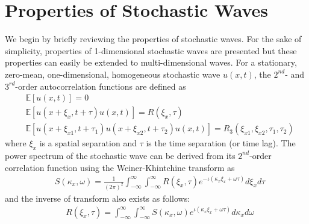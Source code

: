 \documentclass[preprint, review, 12pt]{elsarticle}
\begin{document}

\section{Properties of Stochastic Waves}

We begin by briefly reviewing the properties of stochastic waves. For the sake of simplicity, properties of 1-dimensional stochastic waves are presented but these properties can easily be extended to multi-dimensional waves. For a stationary, zero-mean, one-dimensional, homogeneous stochastic wave $u(x, t)$, the $2^{nd}$- and $3^{rd}$-order autocorrelation functions are defined as
\begin{equation}
\begin{aligned}
	& \mathbb{E}[u(x, t)] = 0\\
	& \mathbb{E}[u(x + \xi_{x}, t + \tau)u(x, t)] = R(\xi_{x}, \tau)\\
	& \mathbb{E}[u(x + \xi_{x1}, t + \tau_{1})u(x + \xi_{x2}, t + \tau_{2})u(x, t)] = R_{3}(\xi_{x1}, \xi_{x2}, \tau_{1}, \tau_{2})
\end{aligned}
\end{equation}
where $\xi_{x}$ is a spatial separation and $\tau$ is the time separation (or time lag). The power spectrum of the stochastic wave can be derived from its $2^{nd}$-order correlation function using the Weiner-Khintchine transform as
\begin{equation}
\begin{aligned}
	& S(\kappa_{x}, \omega) = \frac{1}{(2\pi)^{2}}\int_{-\infty}^{\infty}\int_{-\infty}^{\infty}R(\xi_{x}, \tau)e^{-\iota(\kappa_{x}\xi_{x} + \omega\tau)}d\xi_{x}d\tau
	\label{eqn:second_order_forward_weiner_khintchine}
\end{aligned}
\end{equation}
and the inverse of transform also exists as follows:
\begin{equation}
\begin{aligned}
	&R(\xi_{x}, \tau) = \int_{-\infty}^{\infty}\int_{-\infty}^{\infty} S(\kappa_{x}, \omega)e^{\iota(\kappa_{x}\xi_{x} + \omega\tau)}d\kappa_{x}d\omega
	\label{eqn:second_order_inverse_weiner_khintchine}
\end{aligned}
\end{equation}
\end{document}
